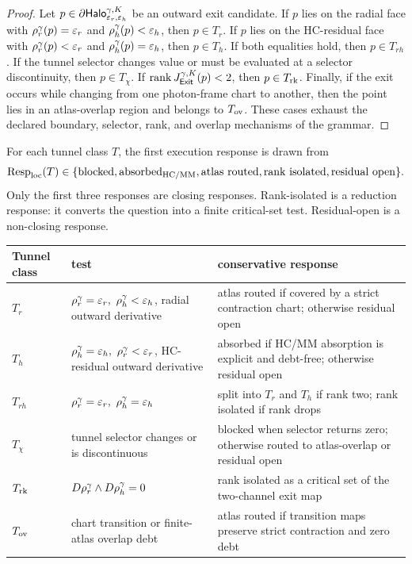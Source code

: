 \begin{proof}
Let \(p\in\partial\mathsf{Halo}_{\varepsilon_r,\varepsilon_h}^{\gamma,K}\) be an outward exit candidate. If \(p\) lies on the radial face with \(\rho_{r}^{\gamma}(p)=\varepsilon_r\) and \(\rho_{h}^{\gamma}(p)<\varepsilon_h\), then \(p\in T_r\). If \(p\) lies on the HC-residual face with \(\rho_{r}^{\gamma}(p)<\varepsilon_r\) and \(\rho_{h}^{\gamma}(p)=\varepsilon_h\), then \(p\in T_h\). If both equalities hold, then \(p\in T_{rh}\). If the tunnel selector changes value or must be evaluated at a selector discontinuity, then \(p\in T_{\chi}\). If \(\operatorname{rank}J_{\mathsf{Exit}}^{\gamma,K}(p)<2\), then \(p\in T_{\mathrm{rk}}\). Finally, if the exit occurs while changing from one photon-frame chart to another, then the point lies in an atlas-overlap region and belongs to \(T_{\mathrm{ov}}\). These cases exhaust the declared boundary, selector, rank, and overlap mechanisms of the grammar.
\end{proof}

\begin{definition}
For each tunnel class \(T\), the first execution response is drawn from
\[
\mathrm{Resp}_{\mathrm{loc}}(T)
\in
\{\mathrm{blocked},\mathrm{absorbed}_{\HC/\MM},\mathrm{atlas\ routed},\mathrm{rank\ isolated},\mathrm{residual\ open}\}.
\]
Only the first three responses are closing responses. Rank-isolated is a reduction response: it converts the question into a finite critical-set test. Residual-open is a non-closing response.
\end{definition}

\begin{center}
\begin{tabular}{>{\raggedright\arraybackslash}p{2.4cm} >{\raggedright\arraybackslash}p{5.2cm} >{\raggedright\arraybackslash}p{5.2cm}}
\toprule
Tunnel class & test & conservative response \\
\midrule
\(T_r\) & \(\rhoR=\epsr,\ \rhoH<\epsh\), radial outward derivative & atlas routed if covered by a strict contraction chart; otherwise residual open \\
\(T_h\) & \(\rhoH=\epsh,\ \rhoR<\epsr\), HC-residual outward derivative & absorbed if HC/MM absorption is explicit and debt-free; otherwise residual open \\
\(T_{rh}\) & \(\rhoR=\epsr,\ \rhoH=\epsh\) & split into \(T_r\) and \(T_h\) if rank two; rank isolated if rank drops \\
\(T_{\chi}\) & tunnel selector changes or is discontinuous & blocked when selector returns zero; otherwise routed to atlas-overlap or residual open \\
\(T_{\mathrm{rk}}\) & \(D\rho_{r}^{\gamma}\wedge D\rho_{h}^{\gamma}=0\) & rank isolated as a critical set of the two-channel exit map \\
\(T_{\mathrm{ov}}\) & chart transition or finite-atlas overlap debt & atlas routed if transition maps preserve strict contraction and zero debt \\
\bottomrule
\end{tabular}
\end{center}

